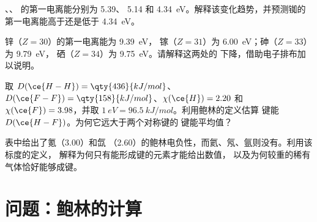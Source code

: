 \begin{exercise}[$\star\star$]\label{exo:b1:periodicity:9}
、、 的第一电离能分别为 5.39、
5.14 和 \qty{4.34}{eV}。解释该变化趋势，并预测铷的
第一电离能高于还是低于 \qty{4.34}{eV}。
\end{exercise}

\begin{exercise}[$\star\star\star$]\label{exo:b1:periodicity:10}
锌（$Z = 30$）的第一电离能为 \qty{9.39}{eV}，
镓（$Z = 31$）为 \qty{6.00}{eV}；砷（$Z = 33$）为 \qty{9.79}{eV}，
硒（$Z = 34$）为 \qty{9.75}{eV}。请解释这两处的
下降，借助电子排布加以说明。
\end{exercise}

\begin{exercise}[$\star\star\star$]\label{exo:b1:periodicity:11}
取 $D(\ce{H-H}) = \qty{436}{kJ/mol}$、$D(\ce{F-F}) =
\qty{158}{kJ/mol}$、$\chi(\ce{H}) = 2.20$ 和 $\chi(\ce{F}) = 3.98$，并取
$\qty{1}{eV} = \qty{96.5}{kJ/mol}$。利用鲍林的定义估算
键能 $D(\ce{H-F})$。为何它远大于两个对称键的
键能平均值？
\end{exercise}

\begin{exercise}[$\star\star\star$]\label{exo:b1:periodicity:12}
表中给出了氪（3.00）和氙
（2.60）的鲍林电负性，而氦、氖、氩则没有。利用该标度的定义，
解释为何只有能形成键的元素才能给出数值，
以及为何较重的稀有气体恰好能够成键。
\end{exercise}

\section{问题：鲍林的计算}

